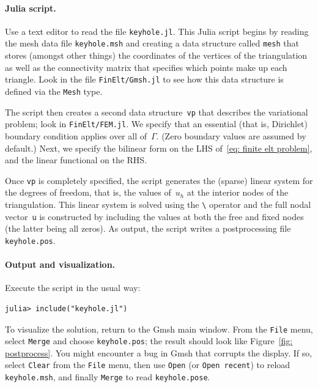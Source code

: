 \documentclass[a4paper,12pt]{article}
\begin{document}
\paragraph{Julia script.}
Use a text editor to read the file \verb!keyhole.jl!.  This 
Julia script begins by reading the mesh data file \verb!keyhole.msh! 
and creating a data structure called \verb!mesh! that stores (amongst 
other things) the coordinates of the vertices of the triangulation as 
well as the connectivity matrix that specifies which points make up 
each triangle.  Look in the file
\verb!FinElt/Gmsh.jl! to see how this data structure is defined via 
the \verb!Mesh! type.  

The script then creates a second data structure~\verb!vp! that 
describes the variational problem; look in \verb!FinElt/FEM.jl!.  We 
specify that an essential (that is, Dirichlet) boundary condition 
applies over all of~$\Gamma$.  (Zero boundary values are assumed by 
default.)  Next, we specify the bilinear form on the LHS 
of~\eqref{eq: finite elt problem}, and the linear functional on the 
RHS.

Once \verb!vp! is completely specified, the script generates the 
(sparse) linear system for the degrees of freedom, that is, the 
values of~$u_h$ at the interior nodes of the triangulation.  This 
linear system is solved using the \verb!\! operator and the full 
nodal vector~\verb!u! is constructed by including the values at both 
the free and fixed nodes (the latter being all zeros).  As output, 
the script writes a postprocessing file \verb!keyhole.pos!.

\paragraph{Output and visualization.}
Execute the script in the usual way:
\begin{verbatim}
julia> include("keyhole.jl")
\end{verbatim}
To visualize the solution, return to the Gmsh main window.  From 
the \verb!File! menu, select \verb!Merge! and choose 
\verb!keyhole.pos!; the result should look like 
Figure~\ref{fig: postprocess}.  You might encounter a bug in Gmsh 
that corrupts the display.  If so, select \verb!Clear! from the 
\verb!File! menu, then use \verb!Open! (or \verb!Open recent!) to 
reload \verb!keyhole.msh!, and finally \verb!Merge! to read 
\verb!keyhole.pose!.
\end{document}

